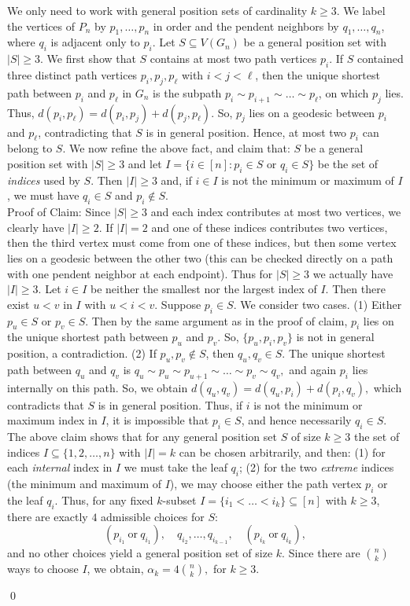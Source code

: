 \documentclass[12pt,twoside]{article}
\renewenvironment{proof}{{\noindent\bfseries Proof.}}{\qed}
\begin{document}
		\begin{proof}
			We  only need to work with general position sets of cardinality  $k\ge 3$. We label the vertices of $P_n$ by $p_1,\dots,p_n$ in order and the pendent
			neighbors by $q_1,\dots,q_n$, where $q_i$ is adjacent only to $p_i$. Let $S\subseteq V(G_n)$ be a general position set with $|S|\ge 3$.
			We first show that $S$ contains at most two path vertices $p_i$. If $S$ contained three distinct path vertices $p_i,p_j,p_\ell$ with $i<j<\ell$, then the unique shortest path between $p_i$ and $p_\ell$ in $G_n$ is the subpath $p_i\sim p_{i+1}\sim \dots\sim p_\ell$, on which $p_j$ lies. Thus, $d(p_i,p_\ell)=d(p_i,p_j)+d(p_j,p_\ell).$ So, $p_j$ lies on a geodesic between $p_i$ and $p_\ell$, contradicting that $S$ is in general position. Hence, at most two $p_i$ can belong to $S$. We now refine the above fact, and claim that: $S$ be a general position set with $|S|\ge 3$ and let
				$I=\{i\in[n]: p_i\in S\text{ or }q_i\in S\}$ be the set of \emph{indices}
				used by $S$. Then $|I|\ge 3$ and, if $i\in I$ is not the minimum or maximum
				of $I$, we must have $q_i\in S$ and $p_i\notin S$. \\
				Proof of Claim: Since $|S|\ge 3$ and each index contributes at most two vertices, we clearly
				have $|I|\ge 2$. If $|I|=2$ and one of these indices contributes two vertices,	then the third vertex must come from one of these indices, but then some	vertex lies on a geodesic between the other two (this can be checked directly	on a path with one pendent neighbor at each endpoint). Thus for $|S|\ge 3$
				we actually have $|I|\ge 3$. Let $i\in I$ be neither the smallest nor the largest index of $I$. Then there
				exist $u<v$ in $I$ with $u<i<v$. Suppose $p_i\in S$. We consider two cases. (1) Either $p_u\in S$ or $p_v\in S$. Then by the same argument as in the  proof of claim, $p_i$ lies on the unique shortest	path between $p_u$ and $p_v$. So, $\{p_u,p_i,p_v\}$ is not in general position, a	contradiction. (2) If $p_u,p_v\notin S$, then $q_u,q_v\in S$. The unique shortest	path between $q_u$ and $q_v$ is $q_u\sim p_u\sim p_{u+1}\sim \dots\sim p_v\sim q_v,$ and again $p_i$ lies internally on this path. So, we obtain $d(q_u,q_v)=d(q_u,p_i)+d(p_i,q_v),$ which contradicts that $S$ is in general position. Thus, if $i$ is not the minimum or maximum index in $I$, it is impossible that $p_i\in S$, and hence necessarily $q_i\in S$. The above claim  shows that for any general position set 	$S$ of size $k\ge 3$ the set of indices $I\subseteq\{1,2,\dots,n\}$ with $|I|=k$ can be	chosen arbitrarily, and then: (1) for each \emph{internal} index in $I$ we must take the leaf $q_i$; (2) for the two \emph{extreme} indices (the minimum and maximum of $I$), we may choose either the path vertex $p_i$ or the leaf $q_i$. Thus, for any fixed $k$-subset $I=\{i_1<\dots<i_k\}\subseteq [n]$ with	$k\ge 3$, there are exactly $4$ admissible choices for $S$:
			\[
			(p_{i_1}\ \text{or}\ q_{i_1}),\quad
			q_{i_2},\dots,q_{i_{k-1}},\quad
			(p_{i_k}\ \text{or}\ q_{i_k}),
			\]
			and no other choices yield a general position set of size $k$. Since there
			are $\binom{n}{k}$ ways to choose $I$, we obtain, $\alpha_k = 4\binom{n}{k},$ for $k\ge 3$. 
			

\end{proof}
\end{document}
